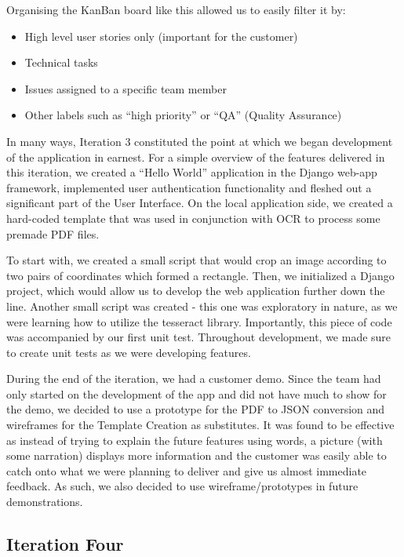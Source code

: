 \documentclass{l3proj}
\begin{document}
Organising the KanBan board like this allowed us to easily filter it by:
\begin{itemize}
\item High level user stories only (important for the customer)
\item Technical tasks
\item Issues assigned to a specific team member
\item Other labels such as ``high priority'' or ``QA'' (Quality Assurance)
\end{itemize}

In many ways, Iteration 3 constituted the point at which we began development of the application in earnest. For a simple overview of the features delivered in this iteration, we created a ``Hello World'' application in the Django web-app framework, implemented user authentication functionality and fleshed out a significant part of the User Interface. On the local application side, we created a hard-coded template that was used in conjunction with OCR to process some premade PDF files.

To start with, we created a small script that would crop an image according to two pairs of coordinates which formed a rectangle. Then, we initialized a Django project, which would allow us to develop the web application further down the line. Another small script was created - this one was exploratory in nature, as we were learning how to utilize the tesseract library. Importantly, this piece of code was accompanied by our first unit test. Throughout development, we made sure to create unit tests as we were developing features.

During the end of the iteration, we had a customer demo. Since the team had only started on the development of the app and did not have much to show for the demo, we decided to use a prototype for the PDF to JSON conversion and wireframes for the Template Creation as substitutes. It was found to be effective as instead of trying to explain the future features using words, a picture (with some narration) displays more information and the customer was easily able to catch onto what we were planning to deliver and give us almost immediate feedback. As such, we also decided to use wireframe/prototypes in future demonstrations.


\subsection{Iteration Four}
\end{document}
